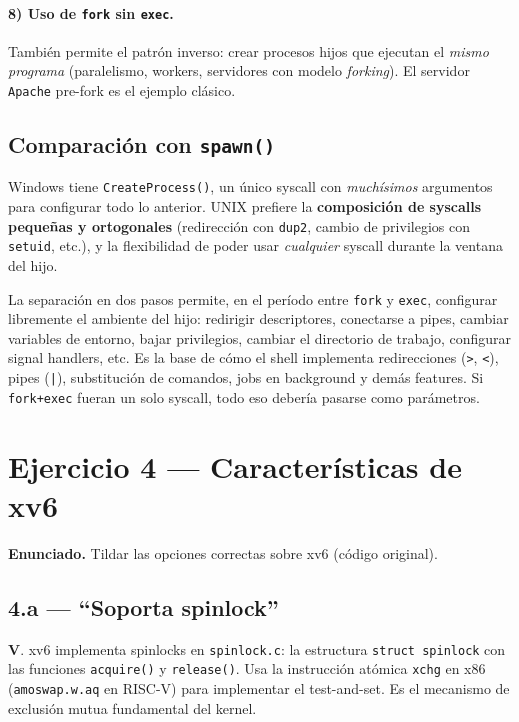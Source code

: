 \documentclass[11pt,a4paper]{article}
\begin{document}
\paragraph{8) Uso de \texttt{fork} sin \texttt{exec}.}
También permite el patrón inverso: crear procesos hijos que ejecutan
el \emph{mismo programa} (paralelismo, workers, servidores con
modelo \emph{forking}). El servidor \texttt{Apache} pre-fork es el
ejemplo clásico.

\subsection*{Comparación con \texttt{spawn()}}

Windows tiene \texttt{CreateProcess()}, un único syscall con
\emph{muchísimos} argumentos para configurar todo lo anterior. UNIX
prefiere la \textbf{composición de syscalls pequeñas y ortogonales}
(redirección con \texttt{dup2}, cambio de privilegios con
\texttt{setuid}, etc.), y la flexibilidad de poder usar
\emph{cualquier} syscall durante la ventana del hijo.

\begin{respuesta}
La separación en dos pasos permite, en el período entre
\texttt{fork} y \texttt{exec}, configurar libremente el ambiente del
hijo: redirigir descriptores, conectarse a pipes, cambiar
variables de entorno, bajar privilegios, cambiar el directorio de
trabajo, configurar signal handlers, etc. Es la base de cómo el
shell implementa redirecciones (\texttt{>}, \texttt{<}), pipes
(\texttt{|}), substitución de comandos, jobs en background y demás
features. Si \texttt{fork+exec} fueran un solo syscall, todo eso
debería pasarse como parámetros.
\end{respuesta}

\section{Ejercicio 4 --- Características de xv6}

\textbf{Enunciado.} Tildar las opciones correctas sobre xv6 (código
original).

\subsection*{4.a --- ``Soporta spinlock''}

\begin{respuesta}
\textbf{V}. xv6 implementa spinlocks en \texttt{spinlock.c}: la
estructura \texttt{struct spinlock} con las funciones
\texttt{acquire()} y \texttt{release()}. Usa la instrucción atómica
\texttt{xchg} en x86 (\texttt{amoswap.w.aq} en RISC-V) para
implementar el test-and-set. Es el mecanismo de exclusión mutua
fundamental del kernel.
\end{respuesta}
\end{document}
